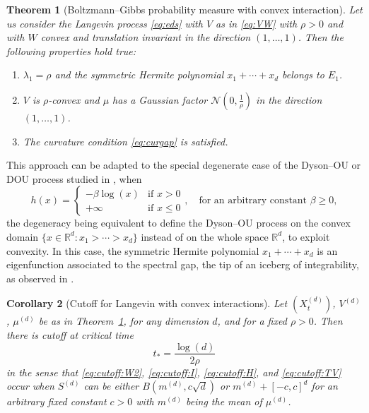 \documentclass[10pt,reqno]{amsart}
\newtheorem{theorem}{Theorem}[section]
\newtheorem{corollary}[theorem]{Corollary}
\numberwithin{equation}{section}
\begin{document}
\begin{theorem}[Boltzmann--Gibbs probability measure with convex
  interaction] \label{thm_bg_convex_inter} Let us consider the Langevin
  process \eqref{eq:eds} with $V$ as in \eqref{eq:VW} with $\rho>0$ and with $W$
  convex and translation invariant in the direction $(1,\ldots,1)$. Then the
  following properties hold true:
  \begin{enumerate}[label=(\roman*)]
  \item $\lambda_1=\rho$ and the symmetric Hermite polynomial $x_1+\cdots+x_d$ belongs to $E_1$. 
  \item $V$ is $\rho$-convex and $\mu$ has a Gaussian factor
    $\mathcal{N}(0,\frac{1}{\rho})$ in the direction $(1,\ldots,1)$.
  \item The curvature condition \eqref{eq:curgap} is satisfied. 
  \end{enumerate}
\end{theorem}

This approach can be adapted to the special degenerate case of the
Dyson--OU or DOU process studied in \cite{MR4175749,BCL23}, when
\begin{equation}
    h(x)=
    \begin{cases}
        -\beta\log(x) & \text{if $x>0$}\\
        +\infty & \text{if $x\leq0$}
    \end{cases},\quad\text{for an arbitrary constant $\beta\geq0$},
\end{equation}
the degeneracy being equivalent to define the Dyson--OU process on
the convex domain $\{x\in\mathbb{R}^d:x_1>\cdots>x_d\}$ instead of on the
whole space $\mathbb{R}^d$, to exploit convexity. In this case, the symmetric
Hermite polynomial $x_1+\cdots+x_d$ is an eigenfunction associated to the
spectral gap, the tip of an iceberg of integrability, as observed
in \cite{MR1133488}.

\begin{corollary}[Cutoff for Langevin with convex interactions]\label{cor_convex_inter} %
  Let $(X_t^{(d)})$, $V^{(d)}$,
  $\mu^{(d)}$ be as in Theorem~\ref{thm_bg_convex_inter}, for any dimension
  $d$, and for a fixed $\rho>0$. Then there is cutoff at critical time
  \begin{equation}
	  t_* =\frac{\log(d)}{2\rho}
  \end{equation}
  in the sense that 
  \eqref{eq:cutoff:W2}, \eqref{eq:cutoff:I}, \eqref{eq:cutoff:H}, and \eqref{eq:cutoff:TV} occur
  when $S^{(d)}$ can be either
  $B(m^{(d)}, c\sqrt{d})$ or $m^{(d)} + [-c, c]^d$ for an arbitrary fixed constant $c>0$ with $m^{(d)}$ being the mean of $\mu^{(d)}$.
\end{corollary}
\end{document}
